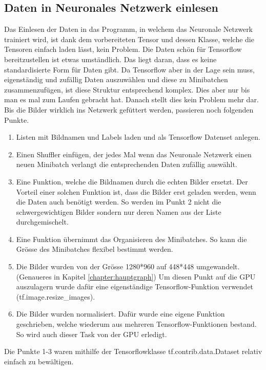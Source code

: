 \subsection{Daten in Neuronales Netzwerk einlesen}
Das Einlesen der Daten in das Programm, in welchem das Neuronale Netzwerk trainiert wird, ist dank dem vorbereiteten Tensor und dessen Klasse, welche die Tensoren einfach laden lässt, kein Problem. 
Die Daten schön für Tensorflow bereitzustellen ist etwas umständlich.
Das liegt daran, dass es keine standardisierte Form für Daten gibt.
Da Tensorflow aber in der Lage sein muss, eigenständig und zufällig Daten auszuwählen und diese zu Minibatchen zusammenzufügen, ist diese Struktur entsprechend komplex.
Dies aber nur bis man es mal zum Laufen gebracht hat. 
Danach stellt dies kein Problem mehr dar. 
Bis die Bilder wirklich ins Netzwerk gefüttert werden, passieren noch folgenden Punkte. 
\begin{enumerate}
\item Listen mit Bildnamen und Labels laden und als Tensorflow Datenset anlegen.
\item Einen \grqq{}Shuffler\grqq{} einfügen, der jedes Mal wenn das Neuronale Netzwerk einen neuen Minibatch verlangt die entsprechenden Daten zufällig auswählt.
\item Eine Funktion, welche die Bildnamen durch die echten Bilder ersetzt. 
Der Vorteil einer solchen Funktion ist, dass die Bilder erst geladen werden, wenn die Daten auch benötigt werden. 
So werden im Punkt 2 nicht die schwergewichtigen Bilder sondern nur deren Namen aus der Liste durchgemischelt. 
\item Eine Funktion übernimmt das Organisieren des Minibatches. 
So kann die Grösse des Minibatches flexibel bestimmt werden.
\item Die Bilder wurden von der Grösse 1280*960 auf 448*448 umgewandelt. (Genaueres in Kapitel \ref{chapter:hauptgraph}) 
Um diesen Punkt auf die GPU auszulagern wurde dafür eine eigenständige Tensorflow-Funktion verwendet (tf.image.resize\_images). 
\item Die Bilder wurden normalisiert. 
Dafür wurde eine eigene Funktion geschrieben, welche wiederum aus mehreren Tensorflow-Funktionen bestand. 
So wird auch dieser Task von der GPU erledigt.
\end{enumerate}
Die Punkte 1-3 waren mithilfe der Tensorflowklasse \grqq{}tf.contrib.data.Dataset\grqq{} relativ einfach zu bewältigen.
